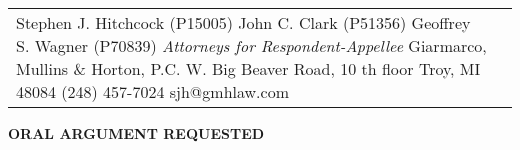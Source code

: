 \documentclass[12pt,\documentclassflag]{michiganCourtOfAppealsBrief}
\begin{document}
\begin{centering}
\begin{tabular}{p{} p{}}
{  Stephen J. Hitchcock (P15005)\newline
  John C. Clark (P51356) \newline
  Geoffrey S. Wagner (P70839)\newline
  \emph{Attorneys for Respondent-Appellee}\newline
Giarmarco, Mullins \& Horton, P.C.\newline
101 W. Big Beaver Road, 10 th floor\newline
Troy, MI 48084\newline
(248) 457-7024\newline
sjh@gmhlaw.com\newline
~}
\end{tabular}
\makeandletter
\par\vspace{\baselineskip}\vspace{\baselineskip}\vspace{\baselineskip}

\textbf{ORAL ARGUMENT REQUESTED}


\end{centering}

\pagestyle{romanparen}
\end{document}
